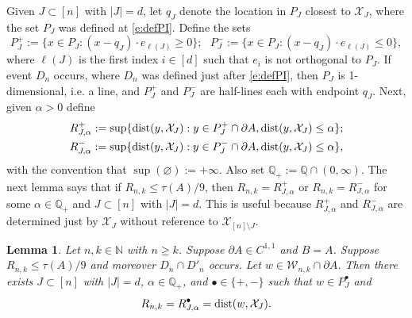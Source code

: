 \documentclass[12pt]{article}
\newcommand{\N}{\mathbb{N}}
\newcommand{\cX}{\mathcal{X}}
\newcommand{\cW}{\mathcal{W}}
\newcommand{\X}{\mathcal{X}}
\renewcommand{\emptyset}{\varnothing}
\newcommand{\dist}{{\rm dist}}
\newtheorem{lemm}{Lemma}
\begin{document}
Given $J \subset [n]$ with $|J|=d$, let $q_J$ denote the
location in $P_J$ closest to $\cX_J$, where 
	the set $P_J$ was defined at \eqref{e:defPI}.
	Define the sets
	$$
	P_J^+ := \{x \in P_J: (x-q_J) \cdot e_{\ell(J)} \geq 0\};
	~~~ 
	P_J^- := \{x \in P_J: (x-q_J) \cdot e_{\ell(J)} \leq 0\},
	$$
	where $\ell(J)$ is the first index $i \in [d]$ such
	that $e_i$ is not orthogonal to $P_J$.
	If event $D_n$ occurs,
	where $D_n$ was defined just after 
	\eqref{e:defPI}, then $P_J$ 
	is 1-dimensional, i.e. a line, and 
	$P_J^+$ and $P_J^-$ are half-lines each with endpoint  $q_J$. 
	Next, given $\alpha >0$ define
	\begin{align*}
	R_{J,\alpha}^+ :=
	 \sup \{ \dist(y,\X_J): y \in P_J^+ \cap
	 \partial A, \dist(y, \cX_J) \leq \alpha \}; \\
	R_{J,\alpha}^- :=
	 \sup \{ \dist(y,\X_J): y \in P_J^- \cap
	 \partial A, \dist(y, \cX_J) \leq \alpha \}, 
	\end{align*}
	with the convention that $\sup(\emptyset) := +\infty$.
	Also set $\mathbb Q_+:= \mathbb Q \cap (0,\infty)$.
	The next lemma says that if $R_{n,k} \leq \tau(A)/9$,
	then $R_{n,k} = R^+_{J,\alpha}$ or
	 $R_{n,k} = R^-_{J,\alpha}$ for some 
	 $\alpha \in \mathbb Q_+$ and $J \subset [n]$ with $|J| =d$.
	 This is useful because
	 $R_{J,\alpha}^+$ and $R_{J,\alpha}^-$ 
	 are determined just by $\X_J$ without reference to
	 $\X_{[n] \setminus J}$.
	\begin{lemm}
		\label{l:Rdot}
		Let $n, k \in \N$ with $n \geq k$.
		Suppose $\partial A \in C^{1,1}$ and $B=A$. Suppose 
		$R_{n,k} \leq \tau(A)/9$ and 
	moreover	$D_n \cap D'_n$ occurs.
		Let
		$w \in \cW_{n,k} \cap \partial A$.
		Then there exists $J \subset [n]$ with $|J|= d$,
		$\alpha \in  \mathbb Q_+$, and
		$\bullet \in \{+,-\}$ 
		such that $w \in P_J^\bullet$ and 
		$$
		R_{n,k} = R_{J,\alpha}^\bullet = \dist(w,\cX_J).
		$$
	\end{lemm}
\end{document}
